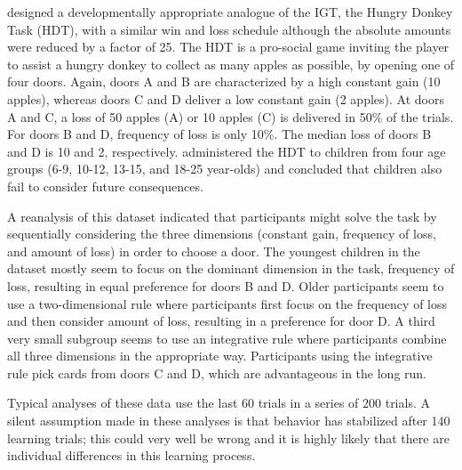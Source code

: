 \documentclass[a4paper,12pt,man,english]{apa} %
\newcommand{\citet}{\citeA}
\begin{document}
\citet{Crone2004} designed a developmentally appropriate analogue of
the IGT, the Hungry Donkey Task (HDT), with a similar win and loss
schedule although the absolute amounts were reduced by a factor of 25.
The HDT is a pro-social game inviting the player to assist a hungry
donkey to collect as many apples as possible, by opening one of four
doors.  Again, doors A and B are characterized by a high constant gain
(10 apples), whereas doors C and D deliver a low constant gain (2
apples).  At doors A and C, a loss of 50 apples (A) or 10 apples (C)
is delivered in 50\% of the trials.  For doors B and D, frequency of
loss is only 10\%.  The median loss of doors B and D is 10 and 2,
respectively.  \citet{Crone2004} administered the HDT to children from
four age groups (6-9, 10-12, 13-15, and 18-25 year-olds) and concluded
that children also fail to consider future consequences.

A reanalysis of this dataset \cite{Huizenga2007} indicated that
participants might solve the task by sequentially considering the
three dimensions (constant gain, frequency of loss, and amount of
loss) in order to choose a door.  The youngest children in the
dataset mostly seem to focus on the dominant dimension in the task, frequency
of loss, resulting in equal preference for doors B and D. Older
participants seem to use a two-dimensional rule where participants
first focus on the frequency of loss and then consider amount of loss,
resulting in a preference for door D. A third very small subgroup
seems to use an integrative rule where participants combine all three
dimensions in the appropriate way.  Participants using the integrative
rule pick cards from doors C and D, which are advantageous in the long
run.

Typical analyses of these data use the last 60 trials in a series of
200 trials.  A silent assumption made in these analyses is
that behavior has stabilized after 140 learning trials; this could
very well be wrong and it is highly likely that there are individual
differences in this learning process.
\end{document}
